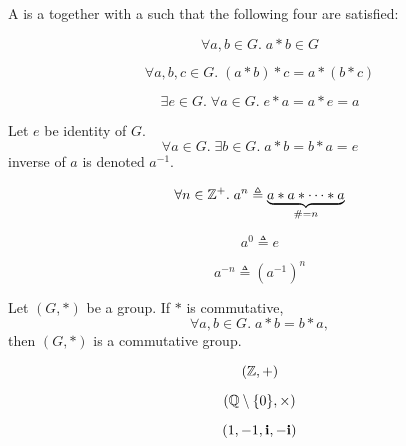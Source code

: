 
\begin{frame}
  \begin{definition}[Group (群)]
    A  is a 
    together with a 
    such that the following four  are satisfied:

    \pause
    \vspace{0.30cm}
    \begin{description}[<+->][Associativity:]
      \item[Closure (封闭):]
        \[
          \forall a, b \in G.\; a \ast b \in G
        \]
      \item[Associativity (结合律):]
        \[
          \forall a, b, c \in G.\; (a \ast b) \ast c = a \ast (b \ast c)
        \]
      \item[Identity (单位元):]
        \[
          \exists e \in G.\; \forall a \in G.\; e \ast a = a \ast e = a
        \]
      \item[Inverse (逆元):] Let $e$ be  identity of $G$.
        \[
          \forall a \in G.\; \exists b \in G.\; a \ast b = b \ast a = e
        \]
         inverse of $a$ is denoted $a^{-1}$.
    \end{description}
  \end{definition}
\end{frame}

\begin{frame}
  \[
    \forall n \in \mathbb{Z}^{+}.\; a^{n} \triangleq \underbrace{a \ast a \ast \dots \ast a}_{\# = n}
  \]

  \[
    a^{0} \triangleq e
  \]

  \[
    a^{-n} \triangleq (a^{-1})^{n}
  \]
\end{frame}

\begin{frame}
  \begin{definition}
    Let $(G, \ast)$ be a group. If $\ast$ is commutative,
    \[
      \forall a, b \in G.\; a \ast b = b \ast a,
    \]
    then $(G, \ast)$ is a commutative group.
  \end{definition}
\end{frame}

\begin{frame}{}
    \[
      (\mathbb{Z}, +)
    \]

    \pause
    \[
      (\mathbb{Q} \setminus \{0\}, \times)
    \]

    \pause
    \[
      (1, -1, \text{\bf i}, -\text{\bf i})
    \]
\end{frame}


